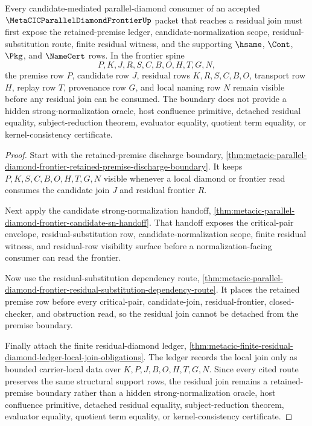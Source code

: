 \begin{theorem}
\label{thm:metacic-parallel-diamond-retained-premise-boundary}
Every candidate-mediated parallel-diamond consumer of an accepted $\MetaCICParallelDiamondFrontierUp$ packet that reaches a residual join must first expose the retained-premise ledger, candidate-normalization scope, residual-substitution route, finite residual witness, and the supporting $\hsame$, $\Cont$, $\Pkg$, and $\NameCert$ rows. In the frontier spine
$$
P,K,J,R,S,C,B,O,H,T,G,N ,
$$
the premise row $P$, candidate row $J$, residual rows $K,R,S,C,B,O$, transport row $H$, replay row $T$, provenance row $G$, and local naming row $N$ remain visible before any residual join can be consumed. The boundary does not provide a hidden strong-normalization oracle, host confluence primitive, detached residual equality, subject-reduction theorem, evaluator equality, quotient term equality, or kernel-consistency certificate.
\end{theorem}
\begin{proof}
Start with the retained-premise discharge boundary, \autoref{thm:metacic-parallel-diamond-frontier-retained-premise-discharge-boundary}. It keeps $P,K,S,C,B,O,H,T,G,N$ visible whenever a local diamond or frontier read consumes the candidate join $J$ and residual frontier $R$.

Next apply the candidate strong-normalization handoff, \autoref{thm:metacic-parallel-diamond-frontier-candidate-sn-handoff}. That handoff exposes the critical-pair envelope, residual-substitution row, candidate-normalization scope, finite residual witness, and residual-row visibility surface before a normalization-facing consumer can read the frontier.

Now use the residual-substitution dependency route, \autoref{thm:metacic-parallel-diamond-frontier-residual-substitution-dependency-route}. It places the retained premise row before every critical-pair, candidate-join, residual-frontier, closed-checker, and obstruction read, so the residual join cannot be detached from the premise boundary.

Finally attach the finite residual-diamond ledger, \autoref{thm:metacic-finite-residual-diamond-ledger-local-join-obligations}. The ledger records the local join only as bounded carrier-local data over $K,P,J,B,O,H,T,G,N$. Since every cited route preserves the same structural support rows, the residual join remains a retained-premise boundary rather than a hidden strong-normalization oracle, host confluence primitive, detached residual equality, subject-reduction theorem, evaluator equality, quotient term equality, or kernel-consistency certificate.
\end{proof}
